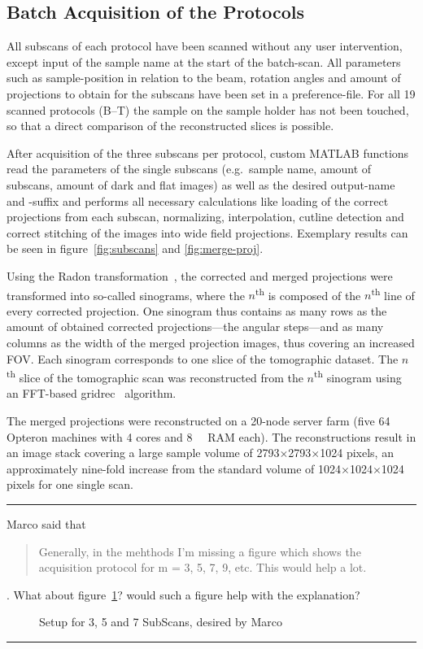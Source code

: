 \cbstart
\subsection{Batch Acquisition of the Protocols}
All subscans of each protocol have been scanned without any user intervention, except input of the sample name at the start of the batch-scan. All parameters such as sample-position in relation to the beam, rotation angles and amount of projections to obtain for the subscans have been set in a preference-file. For all 19 scanned protocols (B--T) the sample on the sample holder has not been touched, so that a direct comparison of the reconstructed slices is possible.

After acquisition of the three subscans per protocol, custom MATLAB functions read the parameters of the single subscans (e.g.\ sample name, amount of subscans, amount of dark and flat images) as well as the desired output-name and -suffix and performs all necessary calculations like loading of the correct projections from each subscan, normalizing, interpolation, cutline detection and correct stitching of the images into wide field projections. Exemplary results can be seen in figure~\ref{fig:subscans} and \ref{fig:merge-proj}.

Using the Radon transformation~\cite{Radon1917}, the corrected and merged projections were transformed into so-called sinograms, where the $n$\textsuperscript{th} is composed of the $n$\textsuperscript{th} line of every corrected projection. One sinogram thus contains as many rows as the amount of obtained corrected projections---the angular steps---and as many columns as the width of the merged projection images, thus covering an increased FOV. Each sinogram corresponds to one slice of the tomographic dataset. The $n$\textsuperscript{th} slice of the tomographic scan was reconstructed from the $n$\textsuperscript{th} sinogram using an FFT-based gridrec~\cite{Dowd1999} algorithm.

The merged projections were reconstructed on a 20-node server farm (five \SI{64}{\bit} Opteron machines with 4 cores and \SI{8}{\giga\byte} RAM each). The reconstructions result in an image stack covering a large sample volume of 2793$\times$2793$\times$1024 pixels, an approximately nine-fold increase from the standard volume of 1024$\times$1024$\times$1024 pixels for one single scan.
\cbend

\hrule

Marco said that \begin{quote}Generally, in the mehthods I'm missing a figure which shows the acquisition protocol for m = 3, 5, 7, 9, etc. This would help a lot.\end{quote}. What about figure~\ref{fig:goldstandard}? would such a figure help with the explanation?

\begin{figure}[htp]
	\centering
	
	\caption{Setup for 3, 5 and 7 SubScans, desired by Marco}
	\label{fig:goldstandard}
\end{figure}

\hrule